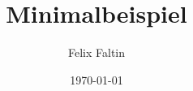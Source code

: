 \documentclass[
    12pt,                                       %
    a4paper,                                    %
    parskip     = half                          %
]{scrreprt}                                     %
\begin{document}
    \title{Minimalbeispiel}                     %
    \author{Felix Faltin}                       %
    \date{\today}                               %


    \maketitle                                  %
    \tableofcontents                            %
    \listoffigures                              %
    \listoftables                               %


    \Blinddocument
\end{document}
